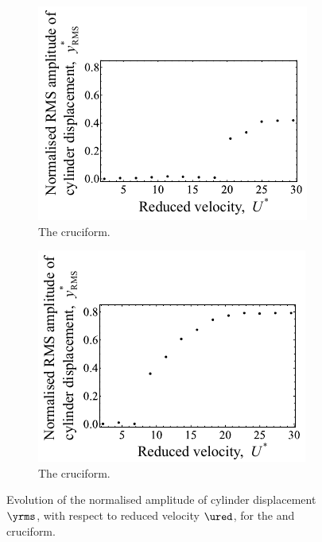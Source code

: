 \documentclass[a4paper,fleqn]{cas-sc}
\begin{document}
\begin{figure}
  \centering
  \begin{subfigure}[h]{0.4\textwidth}
    \includegraphics[width=\textwidth]{figs/yStrRMS4}
  \caption{The \angtw{} cruciform.}
    \label{fig:yStrRMS4}
  \end{subfigure}
  \hspace{6mm}
  \begin{subfigure}[h]{0.4\textwidth}
    \includegraphics[width=\textwidth]{figs/yStrRMS5}
    \caption{The \angon{} cruciform.}
    \label{fig:yStrRMS5}
  \end{subfigure}

  \caption{Evolution of the normalised \rms{} amplitude of cylinder displacement $\yrms$, with respect to reduced velocity $\ured$, for the \angtw{} and \angon{} cruciform.}
  \label{fig:yStrRMS45}
\end{figure}
\end{document}
